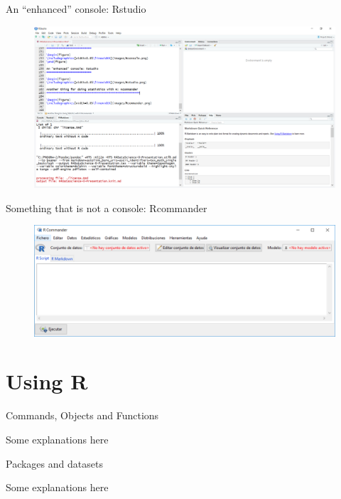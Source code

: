 \documentclass[ignorenonframetext,]{beamer}
\begin{document}
\begin{frame}{An ``enhanced'' console: Rstudio}

\begin{figure}
\includegraphics[width=0.85\linewidth]{images/RStudio.png}
\end{figure}

\end{frame}

\begin{frame}{Something that is not a console: Rcommander}

\begin{figure}
\includegraphics[width=0.85\linewidth]{images/RCommander.png}
\end{figure}

\end{frame}

\section{Using R}\label{using-r}

\begin{frame}{Commands, Objects and Functions}

Some explanations here

\end{frame}

\begin{frame}{Packages and datasets}

Some explanations here

\end{frame}
\end{document}
